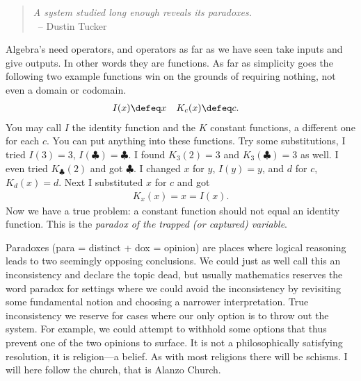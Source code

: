 \begin{quote}
\emph{A system studied long enough reveals its paradoxes.}\\
~\hfill-- Dustin Tucker
\end{quote}
Algebra's need operators, and operators as far as we have seen take 
inputs and give outputs.  In other words they are functions.  
As far as simplicity goes the following two example functions win 
on the grounds of requiring nothing, not even a domain or codomain.
\begin{align*}
    I(x) & \defeq x & 
    K_c(x) & \defeq c.
\end{align*}
You may call $I$ the identity function and the $K$ constant functions,
a different one for each $c$.  You can put anything into these functions.
Try some substitutions, I tried $I(3)=3$, $I(\clubsuit)=\clubsuit$.
I found $K_3(2)=3$ and $K_3(\clubsuit)=3$ as well.  I even tried 
$K_{\clubsuit}(2)$ and got $\clubsuit$.  I changed $x$ for $y$, 
$I(y)=y$, and $d$ for $c$, $K_d(x)=d$. Next I substituted $x$ for $c$ and got
\begin{align*}
    K_x(x)=x=I(x).
\end{align*}
Now we have a true problem: a constant function should not equal 
an identity function.  This is the \emph{paradox of the trapped (or captured) variable}.

Paradoxes (para = distinct + dox = opinion) are places where logical reasoning
leads to two seemingly opposing conclusions.  We could just as well call this an
inconsistency and declare the topic dead, but usually mathematics reserves the
word paradox for settings where we could avoid the inconsistency by revisiting
some fundamental notion and choosing a narrower interpretation.  True
inconsistency we reserve for cases where our only option is to throw out the
system.  For example, we could attempt to withhold some options that thus
prevent one of the two opinions to surface.  It is not a philosophically
satisfying resolution, it is religion---a belief. As with most religions there
will be schisms.  I will here follow the church, that is Alanzo Church.
